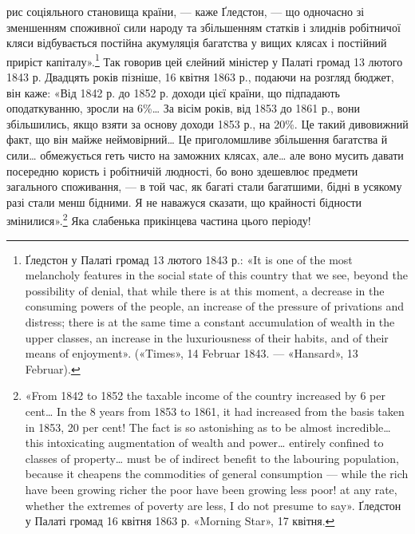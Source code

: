 \parcont{}  %
рис соціяльного становища країни, — каже Ґледстон, — що одночасно
зі зменшенням споживної сили народу та збільшенням
статків і злиднів робітничої кляси відбувається постійна акумуляція
багатства у вищих клясах і постійний приріст капіталу».\footnote{
Ґледстон у Палаті громад 13 лютого 1843 р.: «It is one of the
most melancholy features in the social state of this country that we see,
beyond the possibility of denial, that while there is at this moment, a decrease
in the consuming powers of the people, an increase of the pressure
of privations and distress; there is at the same time a constant accumulation
of wealth in the upper classes, an increase in the luxuriousness of their
habits, and of their means of enjoyment». («Times», 14 Februar 1843. —
«Hansard», 13 Februar).
} Так говорив цей єлейний міністер у Палаті громад
13 лютого 1843 р. Двадцять років пізніше, 16 квітня 1863 р.,
подаючи на розгляд бюджет, він каже: «Від 1842 р. до 1852 р.
доходи цієї країни, що підпадають оподаткуванню, зросли на
6\%\dots{} За вісім років, від 1853 до 1861 р., вони збільшились, якщо
взяти за основу доходи 1853 р., на 20\%. Це такий дивовижний
факт, що він майже неймовірний\dots{} Це приголомшливе збільшення
багатства й сили\dots{} обмежується геть чисто на заможних
клясах, але\dots{} але воно мусить давати посередню користь і робітничій
людності, бо воно здешевлює предмети загального споживання,
— в той час, як багаті стали багатшими, бідні в усякому
разі стали менш бідними. Я не наважуся сказати, що крайності
бідности змінилися».\footnote{
«From 1842 to 1852 the taxable income of the country increased by
6 per cent\dots{} In the 8 years from 1853 to 1861, it had increased from the
basis taken in 1853, 20 per cent! The fact is so astonishing as to be almost
incredible\dots{} this intoxicating augmentation of wealth and power\dots{} entirely
confined to classes of property\dots{} must be of indirect benefit to the
labouring population, because it cheapens the commodities of general consumption
— while the rich have been growing richer the poor have been
growing less poor! at any rate, whether the extremes of poverty are less,
I do not presume to say». Ґледстон у Палаті громад 16 квітня 1863 р.
«Morning Star», 17 квітня.
} Яка слабенька прикінцева частина цього
періоду!

